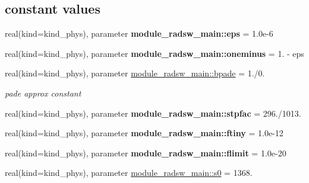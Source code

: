 \subsection*{constant values}
\begin{DoxyCompactItemize}
\item 
\mbox{\label{group__module__radsw__main_ga7d311ceb7f824ea31d31ba8144751b5a}} 
real(kind=kind\+\_\+phys), parameter {\bfseries module\+\_\+radsw\+\_\+main\+::eps} = 1.\+0e-\/6
\item 
\mbox{\label{group__module__radsw__main_gac666738c31ea648cae506a47e5a4e43d}} 
real(kind=kind\+\_\+phys), parameter {\bfseries module\+\_\+radsw\+\_\+main\+::oneminus} = 1. -\/ eps
\item 
\mbox{\label{group__module__radsw__main_gacd9ae7c14cbfdc55f1f0fff637ca0331}} 
real(kind=kind\+\_\+phys), parameter \hyperlink{group__module__radsw__main_gacd9ae7c14cbfdc55f1f0fff637ca0331}{module\+\_\+radsw\+\_\+main\+::bpade} = 1./0.
\begin{DoxyCompactList}\small\item\em pade approx constant \end{DoxyCompactList}\item 
\mbox{\label{group__module__radsw__main_ga4d32ea8f0f1bca37e3351a5ae5077f77}} 
real(kind=kind\+\_\+phys), parameter {\bfseries module\+\_\+radsw\+\_\+main\+::stpfac} = 296./1013.
\item 
\mbox{\label{group__module__radsw__main_gabe91ed52b6016e99a2d0c874524fb27f}} 
real(kind=kind\+\_\+phys), parameter {\bfseries module\+\_\+radsw\+\_\+main\+::ftiny} = 1.\+0e-\/12
\item 
\mbox{\label{group__module__radsw__main_gac3fcae797833888c5f47fc5ed821c06f}} 
real(kind=kind\+\_\+phys), parameter {\bfseries module\+\_\+radsw\+\_\+main\+::flimit} = 1.\+0e-\/20
\item 
\mbox{\label{group__module__radsw__main_ga244c149eb05c0675a7e040dbf7e2bc4b}} 
real(kind=kind\+\_\+phys), parameter \hyperlink{group__module__radsw__main_ga244c149eb05c0675a7e040dbf7e2bc4b}{module\+\_\+radsw\+\_\+main\+::s0} = 1368.

\end{DoxyCompactItemize}
